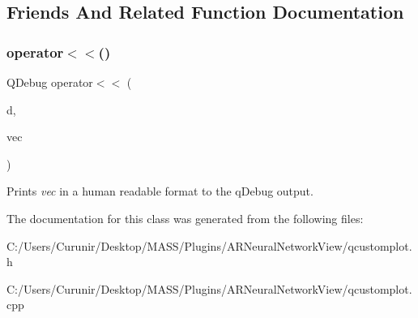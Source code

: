 \subsection{Friends And Related Function Documentation}
\mbox{\label{class_q_c_p_vector2_d_a6c757af9671d925af4a36c2f58fb7234}} 
\subsubsection{\texorpdfstring{operator$<$$<$()}{operator<<()}}
{\footnotesize\ttfamily Q\+Debug operator$<$$<$ (\begin{DoxyParamCaption}\item[{Q\+Debug}]{d,  }\item[{const \hyperlink{class_q_c_p_vector2_d}{Q\+C\+P\+Vector2D} \&}]{vec }\end{DoxyParamCaption})\hspace{0.3cm}{\ttfamily [related]}}

Prints {\itshape vec} in a human readable format to the q\+Debug output. 

The documentation for this class was generated from the following files\+:\begin{DoxyCompactItemize}
\item 
C\+:/\+Users/\+Curunir/\+Desktop/\+M\+A\+S\+S/\+Plugins/\+A\+R\+Neural\+Network\+View/qcustomplot.\+h\item 
C\+:/\+Users/\+Curunir/\+Desktop/\+M\+A\+S\+S/\+Plugins/\+A\+R\+Neural\+Network\+View/qcustomplot.\+cpp\end{DoxyCompactItemize}
